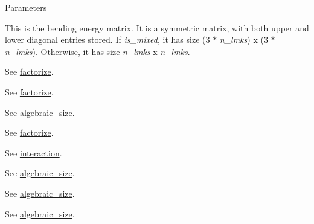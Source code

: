 \begin{DoxyParams}{Parameters}
\item[\mbox{\tt[out]} {\em B}]This is the bending energy matrix. It is a symmetric matrix, with both upper and lower diagonal entries stored. If {\itshape is\_\-mixed\/}, it has size (3 $\ast$ {\itshape n\_\-lmks\/}) x (3 $\ast$ {\itshape n\_\-lmks\/}). Otherwise, it has size {\itshape n\_\-lmks\/} x {\itshape n\_\-lmks\/}. \item[\mbox{\tt[in]} {\em F}]See \hyperlink{classew_1_1Tps3_abc71d05432b69dcaab46b5a2e2dc5e2a}{factorize}. \item[\mbox{\tt[in]} {\em pivots}]See \hyperlink{classew_1_1Tps3_abc71d05432b69dcaab46b5a2e2dc5e2a}{factorize}. \item[\mbox{\tt[in]} {\em relax\_\-dims\_\-opt}]See \hyperlink{classew_1_1Tps3_a11e70148259244e2c975dabd72ceb28c}{algebraic\_\-size}. \item[\mbox{\tt[in]} {\em relax\_\-params\_\-opt}]See \hyperlink{classew_1_1Tps3_abc71d05432b69dcaab46b5a2e2dc5e2a}{factorize}. \item[\mbox{\tt[in]} {\em n\_\-lmks}]See \hyperlink{classew_1_1Tps3_add5597fd0edb1437c9694d765c507aff}{interaction}. \item[\mbox{\tt[in]} {\em f\_\-size}]See \hyperlink{classew_1_1Tps3_a11e70148259244e2c975dabd72ceb28c}{algebraic\_\-size}. \item[\mbox{\tt[in]} {\em is\_\-mixed}]See \hyperlink{classew_1_1Tps3_a11e70148259244e2c975dabd72ceb28c}{algebraic\_\-size}. \item[\mbox{\tt[in]} {\em is\_\-reduced}]See \hyperlink{classew_1_1Tps3_a11e70148259244e2c975dabd72ceb28c}{algebraic\_\-size}. \end{DoxyParams}

